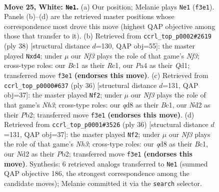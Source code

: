 \documentclass[11pt]{article}
\begin{document}
\begin{figure}[p]\centering
\begin{subfigure}{0.46\textwidth}\centering
\resizebox{\linewidth}{!}{%
\newchessgame
\chessboard[
  setfen={1rbq3k/p1n2rn1/5bpp/2pp1p2/P4P2/1P3NP1/Q2NP1BP/1RBR2K1 w - - 6 25},
  showmover=false,
  pgfstyle=straightmove, color=movearrow, markmove={f3-e1}
]}
\caption{}
\end{subfigure}\hfill
\begin{subfigure}{0.46\textwidth}\centering
\resizebox{\linewidth}{!}{%
\newchessgame
\chessboard[
  setfen={1r1qrbk1/1bpn1p2/3p2pp/1p5n/1P1pP3/P4N1P/1BBN1PP1/2RQR1K1 w - - 0 20},
  showmover=false,
  pgfstyle=straightmove, color=movearrow, markmove={f3-d4}
]}
\caption{}
\end{subfigure}
\\[4pt]
\begin{subfigure}{0.46\textwidth}\centering
\resizebox{\linewidth}{!}{%
\newchessgame
\chessboard[
  setfen={2kr1b1r/pb1n1p2/2q1p2p/1p4p1/3P4/3QNP1N/PPP3PP/R1B2RK1 w - - 1 19},
  showmover=false,
  pgfstyle=straightmove, color=movearrow, markmove={h3-f2}
]}
\caption{}
\end{subfigure}\hfill
\begin{subfigure}{0.46\textwidth}\centering
\resizebox{\linewidth}{!}{%
\newchessgame
\chessboard[
  setfen={2kr1b1r/pb1n1p2/2q1p2p/1p4p1/3P4/3QNP1N/PPP3PP/R1B2RK1 w - - 1 19},
  showmover=false,
  pgfstyle=straightmove, color=movearrow, markmove={h3-f2}
]}
\caption{}
\end{subfigure}
\caption{\textbf{Move 25, White: \texttt{Ne1}.} (a) Our position; Melanie plays \texttt{Ne1} (\texttt{f3e1}). Panels (b)--(d) are the retrieved master positions whose correspondence most drove this move (highest QAP objective among those that transfer to it). (b) Retrieved from \texttt{ccrl\_top\_p0002\#2619} (ply 38) [structural distance $d$=130, QAP obj=55]: the master played \texttt{Nxd4}; under $\mu$ our \emph{Nf3} plays the role of that game's \emph{Nf3}; cross-type roles: our \emph{B}c1 as their \emph{R}c1, our \emph{P}a4 as their \emph{Q}d1; transferred move \texttt{f3e1} \textbf{(endorses this move)}. (c) Retrieved from \texttt{ccrl\_top\_p0000\#637} (ply 36) [structural distance $d$=131, QAP obj=37]: the master played \texttt{Nf2}; under $\mu$ our \emph{Nf3} plays the role of that game's \emph{Nh3}; cross-type roles: our \emph{q}d8 as their \emph{B}c1, our \emph{N}d2 as their \emph{P}b2; transferred move \texttt{f3e1} \textbf{(endorses this move)}. (d) Retrieved from \texttt{ccrl\_top\_p0001\#3526} (ply 36) [structural distance $d$=131, QAP obj=37]: the master played \texttt{Nf2}; under $\mu$ our \emph{Nf3} plays the role of that game's \emph{Nh3}; cross-type roles: our \emph{q}d8 as their \emph{B}c1, our \emph{N}d2 as their \emph{P}b2; transferred move \texttt{f3e1} \textbf{(endorses this move)}. Synthesis: 6 retrieved analogs transferred to \texttt{Ne1} (summed QAP objective 186, the strongest correspondence among the candidate moves); Melanie committed it via the \texttt{search} selector.}
\label{fig:thought-m48}
\end{figure}
\end{document}
